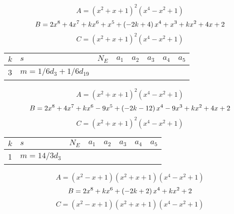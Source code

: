 \documentclass{amsart}
\begin{document}
$$A=(x^2
 + x
 + 1)^{2}(x^4
 - x^2
 + 1)$$
$$B=2\*x^8
 + 4\*x^7
 + k\*x^6
 + x^5
 + \left(-2\*k
 + 4\right) \*x^4
 + x^3
 + k\*x^2
 + 4\*x
 + 2$$
$$C=(x^2
 + x
 + 1)^{2}(x^4
 - x^2
 + 1)$$
\begin{longtable}{|l|l|l|lllll|}
\hline
$k$ & $s$ & $N_E$ & $a_1$ & $a_2$ & $a_3$ & $a_4$ & $a_5$\\
\hline
3&$m=1/6d_{3}+1/6d_{19}$&&\multicolumn{5}{c|}{}\\
\hline
\end{longtable}
$$A=(x^2
 + x
 + 1)^{2}(x^4
 - x^2
 + 1)$$
$$B=2\*x^8
 + 4\*x^7
 + k\*x^6
 - 9\*x^5
 + \left(-2\*k
 - 12\right) \*x^4
 - 9\*x^3
 + k\*x^2
 + 4\*x
 + 2$$
$$C=(x^2
 + x
 + 1)^{2}(x^4
 - x^2
 + 1)$$
\begin{longtable}{|l|l|l|lllll|}
\hline
$k$ & $s$ & $N_E$ & $a_1$ & $a_2$ & $a_3$ & $a_4$ & $a_5$\\
\hline
1&$m=14/3d_{3}$&&\multicolumn{5}{c|}{}\\
\hline
\end{longtable}
$$A=(x^2
 - x
 + 1)(x^2
 + x
 + 1)(x^4
 - x^2
 + 1)$$
$$B=2\*x^8
 + k\*x^6
 + \left(-2\*k
 + 2\right) \*x^4
 + k\*x^2
 + 2$$
$$C=(x^2
 - x
 + 1)(x^2
 + x
 + 1)(x^4
 - x^2
 + 1)$$
\end{document}
